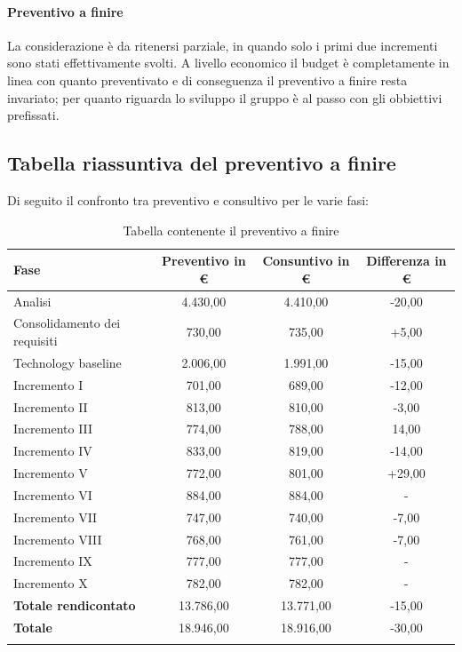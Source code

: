 		\paragraph{Preventivo a finire}
			La considerazione è da ritenersi parziale, in quando solo i primi due incrementi sono stati effettivamente svolti. A livello economico il budget è completamente in linea con quanto preventivato e di conseguenza il preventivo a finire resta invariato; per quanto riguarda lo sviluppo il gruppo è al passo con gli obbiettivi prefissati.
			\pagebreak
	
		
		
	 	\subsection{Tabella riassuntiva del preventivo a finire}
	 		Di seguito il confronto tra preventivo e consultivo per le varie fasi:
			 \begin{longtable}{|l|c|c|c|}
			 	\hline
			 	\rowcolor{lighter-grayer}
			 	\textbf{Fase} & \textbf{Preventivo in €} & \textbf{Consuntivo in €} & \textbf{Differenza in €}\\
			 	\hline
				\endfirsthead
			 	
			 	\hline
			 	Analisi & 4.430,00 & 4.410,00 & -20,00\\
			 	\hline
			 	\hline
			 	Consolidamento dei requisiti & 730,00 & 735,00 & +5,00\\
			 	\hline
			 	\hline
			 	Technology baseline & 2.006,00 & 1.991,00 & -15,00\\
			 	\hline
			 	\hline
			 	Incremento I & 701,00 & 689,00 & -12,00\\
			 	\hline
			 	\hline
			 	Incremento II & 813,00 & 810,00 & -3,00\\
			 	\hline
			 	\hline
			 	Incremento III & 774,00 & 788,00 & 14,00\\
			 	\hline
			 	\hline
			 	Incremento IV & 833,00 & 819,00 & -14,00\\
			 	\hline
			 	\hline
			 	Incremento V & 772,00 & 801,00 & +29,00\\
			 	\hline
			 	\hline
			 	Incremento VI & 884,00 & 884,00 & -\\
			 	\hline
			 	\hline
			 	Incremento VII & 747,00 & 740,00 & -7,00\\
			 	\hline
			 	\hline
			 	Incremento VIII & 768,00 & 761,00 & -7,00\\
			 	\hline
			 	\hline
			 	Incremento IX & 777,00 & 777,00 & -\\
			 	\hline
			 	\hline
			 	Incremento X & 782,00 & 782,00 & -\\
			 	\hline
			 	\textbf{Totale rendicontato} & 13.786,00 & 13.771,00 & -15,00\\
			 	\hline
			 	\hline
			 	\textbf{Totale} & 18.946,00 & 18.916,00 & -30,00\\
			 	\hline
			 	\caption{Tabella contenente il preventivo a finire}
			 \end{longtable}
